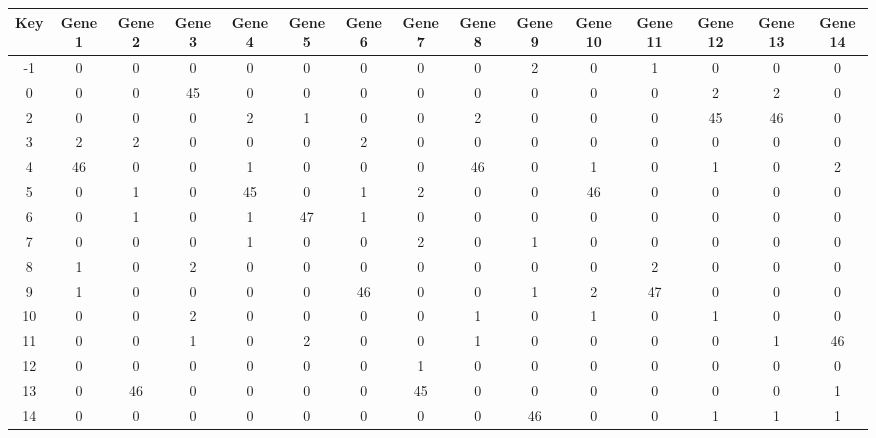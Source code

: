 \begin{tabular}{|c|c|c|c|c|c|c|c|c|c|c|c|c|c|c|}
\hline
Key & Gene 1 & Gene 2 & Gene 3 & Gene 4 & Gene 5 & Gene 6 & Gene 7 & Gene 8 & Gene 9 & Gene 10 & Gene 11 & Gene 12 & Gene 13 & Gene 14 \\
\hline
-1 & 0 & 0 & 0 & 0 & 0 & 0 & 0 & 0 & 2 & 0 & 1 & 0 & 0 & 0 \\
0 & 0 & 0 & 45 & 0 & 0 & 0 & 0 & 0 & 0 & 0 & 0 & 2 & 2 & 0 \\
2 & 0 & 0 & 0 & 2 & 1 & 0 & 0 & 2 & 0 & 0 & 0 & 45 & 46 & 0 \\
3 & 2 & 2 & 0 & 0 & 0 & 2 & 0 & 0 & 0 & 0 & 0 & 0 & 0 & 0 \\
4 & 46 & 0 & 0 & 1 & 0 & 0 & 0 & 46 & 0 & 1 & 0 & 1 & 0 & 2 \\
5 & 0 & 1 & 0 & 45 & 0 & 1 & 2 & 0 & 0 & 46 & 0 & 0 & 0 & 0 \\
6 & 0 & 1 & 0 & 1 & 47 & 1 & 0 & 0 & 0 & 0 & 0 & 0 & 0 & 0 \\
7 & 0 & 0 & 0 & 1 & 0 & 0 & 2 & 0 & 1 & 0 & 0 & 0 & 0 & 0 \\
8 & 1 & 0 & 2 & 0 & 0 & 0 & 0 & 0 & 0 & 0 & 2 & 0 & 0 & 0 \\
9 & 1 & 0 & 0 & 0 & 0 & 46 & 0 & 0 & 1 & 2 & 47 & 0 & 0 & 0 \\
10 & 0 & 0 & 2 & 0 & 0 & 0 & 0 & 1 & 0 & 1 & 0 & 1 & 0 & 0 \\
11 & 0 & 0 & 1 & 0 & 2 & 0 & 0 & 1 & 0 & 0 & 0 & 0 & 1 & 46 \\
12 & 0 & 0 & 0 & 0 & 0 & 0 & 1 & 0 & 0 & 0 & 0 & 0 & 0 & 0 \\
13 & 0 & 46 & 0 & 0 & 0 & 0 & 45 & 0 & 0 & 0 & 0 & 0 & 0 & 1 \\
14 & 0 & 0 & 0 & 0 & 0 & 0 & 0 & 0 & 46 & 0 & 0 & 1 & 1 & 1 \\
\hline
\end{tabular}